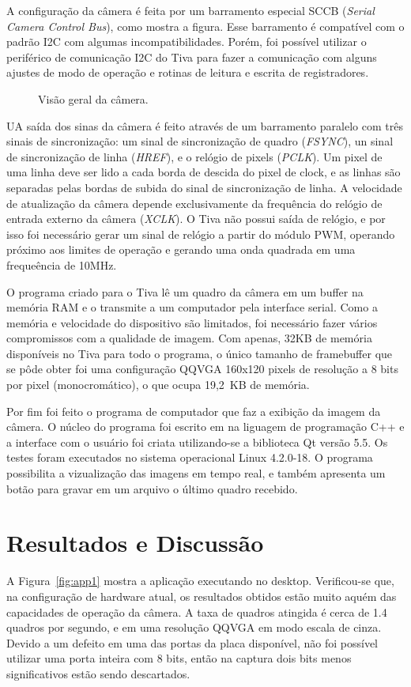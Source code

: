 \documentclass[hidelinks, a4paper, 9pt, twocolumn]{article}
\newcommand{\fig}[4][ht!]{
  \begin{figure}[#1]
    {\centering{\texttt{[image: \#2]}}\par}
    \caption{#3}
    \label{fig:#2}
  \end{figure}
}
\begin{document}
A configuração da câmera é feita por um barramento especial SCCB (\textit{Serial Camera Control Bus}), como mostra a figura. Esse barramento é compatível com o padrão I2C com algumas incompatibilidades. Porém, foi possível utilizar o periférico de comunicação I2C do Tiva para fazer a comunicação com alguns ajustes de modo de operação e rotinas de leitura e escrita de registradores.

\fig{ov7673}{Visão geral da câmera.}{width=\columnwidth}

UA saída dos sinas da câmera é feito através de um barramento paralelo com três sinais de sincronização: um sinal de sincronização de quadro (\textit{FSYNC}), un sinal de sincronização de linha (\textit{HREF}), e o relógio de pixels (\textit{PCLK}). Um pixel de uma linha deve ser lido a cada borda de descida do pixel de clock, e as linhas são separadas pelas bordas de subida do sinal de sincronização de linha. A velocidade de atualização da câmera depende exclusivamente da frequência do relógio de entrada externo da câmera (\textit{XCLK}). O Tiva não possui saída de relógio, e por isso foi necessário gerar um sinal de relógio a partir do módulo PWM, operando próximo aos limites de operação e gerando uma onda quadrada em uma frequeência de 10MHz. 

O programa criado para o Tiva lê um quadro da câmera em um buffer na memória RAM e o transmite a um computador pela interface serial. Como a memória e velocidade do dispositivo são limitados, foi necessário fazer vários compromissos com a qualidade de imagem. Com apenas, 32KB de memória disponíveis no Tiva para todo o programa, o único tamanho de framebuffer que se pôde obter foi uma configuração QQVGA 160x120 pixels de resolução a 8 bits por pixel (monocromático), o que ocupa 19,2~KB de memória. 

Por fim foi feito o programa de computador que faz a exibição da imagem da câmera. O núcleo do programa foi escrito em na liguagem de programação C++ e a interface com o usuário foi criata utilizando-se a biblioteca Qt versão 5.5. Os testes foram executados no sistema operacional Linux 4.2.0-18. O programa possibilita a vizualização das imagens em tempo real, e também apresenta um botão para gravar em um arquivo o último quadro recebido. 

\section{Resultados e Discussão}


A Figura~\ref{fig:app1} mostra a aplicação executando no desktop. Verificou-se que, na configuração de hardware atual, os resultados obtidos estão muito aquém das capacidades de operação da câmera. A taxa de quadros atingida é cerca de 1.4 quadros por segundo, e em uma resolução QQVGA em modo escala de cinza. Devido a um defeito em uma das portas da placa disponível, não foi possível utilizar uma porta inteira com 8 bits, então na captura dois bits menos significativos estão sendo descartados.
\end{document}
